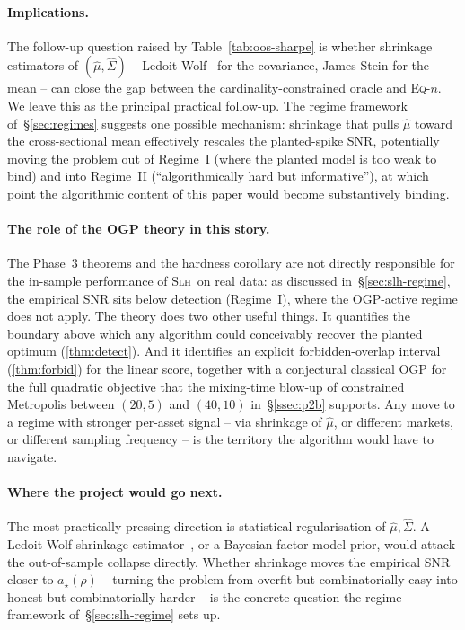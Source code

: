 \paragraph{Implications.}
The follow-up question raised by Table~\ref{tab:oos-sharpe} is whether shrinkage
estimators of $(\hat\mu, \hat\Sigma)$ -- Ledoit-Wolf~\cite{ledoit-wolf} for the
covariance, James-Stein for the mean -- can close the gap between the
cardinality-constrained oracle and \textsc{Eq-$n$}. We leave this as the principal
practical follow-up. The regime framework of~\S\ref{sec:regimes} suggests one
possible mechanism: shrinkage that pulls $\hat\mu$ toward the cross-sectional mean
effectively rescales the planted-spike SNR, potentially moving the problem out of
Regime~I (where the planted model is too weak to bind) and into Regime~II
(``algorithmically hard but informative''), at which point the algorithmic content of
this paper would become substantively binding.

\paragraph{The role of the OGP theory in this story.} The Phase~3 theorems and the
hardness corollary are not directly responsible for the in-sample performance of
\textsc{Slh}\ on real data: as discussed in~\S\ref{sec:slh-regime}, the empirical SNR
sits below detection (Regime~I), where the OGP-active regime does not apply. The
theory does two other useful things. It quantifies the boundary above which any
algorithm could conceivably recover the planted optimum (\cref{thm:detect}). And it
identifies an explicit forbidden-overlap interval (\cref{thm:forbid}) for the linear
score, together with a conjectural classical OGP for the full quadratic objective
that the mixing-time blow-up of constrained Metropolis between $(20,5)$ and
$(40,10)$ in~\S\ref{ssec:p2b} supports. Any move to a regime with stronger per-asset
signal -- via shrinkage of $\hat\mu$, or different markets, or different sampling
frequency -- is the territory the algorithm would have to navigate.

\paragraph{Where the project would go next.} The most practically pressing direction
is statistical regularisation of $\hat\mu,\hat\Sigma$. A Ledoit-Wolf shrinkage
estimator~\cite{ledoit-wolf}, or a Bayesian factor-model prior, would attack the
out-of-sample collapse directly. Whether shrinkage moves the empirical SNR closer to
$a_\star(\rho)$ -- turning the problem from overfit but combinatorially easy into
honest but combinatorially harder -- is the concrete question the regime framework
of~\S\ref{sec:slh-regime} sets up.


